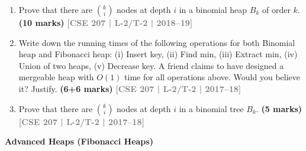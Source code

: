 \documentclass[12pt,a3paper]{article}
\newcommand{\yr}[1]{\hfill\textcolor{gray}{\small\textbf{[#1]}}}
\newcommand{\mk}[1]{\textcolor{orange!70!black}{\small\textbf{(#1 marks)}}}
\newcommand{\subtopic}[2]{%
  \vspace{10pt}
  \noindent\begin{tcolorbox}[colback=#1!8,colframe=#1,boxrule=0.6pt,arc=4pt,
    left=6pt,right=6pt,top=4pt,bottom=4pt]
    \small\bfseries\textcolor{#1}{#2}
  \end{tcolorbox}
  \vspace{2pt}
}
\begin{document}
\begin{enumerate}
\item Prove that there are $\binom{k}{i}$ nodes at depth $i$ in a binomial heap $B_k$ of order $k$.
\mk{10} \yr{CSE 207 | L-2/T-2 | 2018--19}



\item Write down the running times of the following operations for both Binomial heap and Fibonacci heap: (i) Insert key, (ii) Find min, (iii) Extract min, (iv) Union of two heaps, (v) Decrease key. A friend claims to have designed a mergeable heap with $O(1)$ time for all operations above. Would you believe it? Justify. \mk{6+6}
\yr{CSE 207 | L-2/T-2 | 2017--18}


\item Prove that there are $\binom{k}{i}$ nodes at depth $i$ in a binomial tree $B_k$. \mk{5}
\yr{CSE 207 | L-2/T-2 | 2017--18}

\end{enumerate}

\subtopic{cB}{Advanced Heaps (Fibonacci Heaps)}
\label{sub:s2-fibheap}
\end{document}
